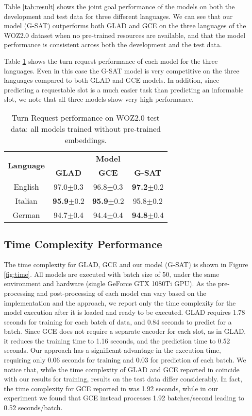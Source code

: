 \documentclass{article}
\begin{document}
Table \ref{tab:result} shows the joint goal performance of the models on both the development and test data for three different languages.
We can see that our model (G-SAT)  outperforms both GLAD and GCE on the three languages of the WOZ2.0 dataset when no pre-trained resources are available, and that the model performance is consistent across both the development and the test data.

Table \ref{tab:req_result} shows the turn request performance of each model for the three languages.
Even in this case the G-SAT model is very competitive on the three languages compared to both GLAD and GCE models.
In addition, since predicting a requestable slot is a much easier task than predicting  an informable slot, we note that all three models show very high performance.

\begin{table}
    \centering
    \begin{tabular}{c|c|c|c}
        \multirow{2}{*}{\textbf{Language}} & \multicolumn{3}{c}{\textbf{Model}}\\
        & \textbf{GLAD} & \textbf{GCE} &\textbf{G-SAT}\\
        \hline
        English & 97.0$\pm$0.3 & 96.8$\pm$0.3 & \textbf{97.2}$\pm$0.2 \\
        Italian & \textbf{95.9}$\pm$0.2 & \textbf{95.9}$\pm$0.2 & 95.8$\pm$0.2 \\
        German & 94.7$\pm$0.4 & 94.4$\pm$0.4 & \textbf{94.8}$\pm$0.4 \\
    \end{tabular}
    \caption{Turn Request performance on WOZ2.0 test data: all models  trained without pre-trained embeddings.}
    \label{tab:req_result}
\end{table}

\subsection{Time Complexity Performance}
The time complexity for GLAD, GCE and our model (G-SAT) is shown in Figure \ref{fig:time}.
All models are executed with batch size of 50, under the same environment and hardware (single GeForce GTX 1080Ti GPU).
As the pre-processing and post-processing of each model can vary based on the implementation and the approach, we report only the time complexity for the model execution after it is loaded and ready to be executed.
GLAD requires 1.78 seconds for training for each batch of data, and 0.84 seconds to predict for a batch.
Since  GCE  does not require a separate encoder for each slot, as in GLAD, it reduces the training time to 1.16 seconds, and the prediction time to 0.52 seconds.
Our approach has a significant advantage in the execution time, requiring only 0.06 seconds for training and 0.03 for prediction of each batch.
We notice that, while the time complexity of GLAD and GCE  reported in \cite{GCE} coincide with our results for training,  results on the test data differ considerably. In fact, the time complexity for GCE reported in \cite{GCE} was 1.92 seconds, while in our experiment we found that GCE instead processes 1.92 batches/second leading to 0.52 seconds/batch.
\end{document}
